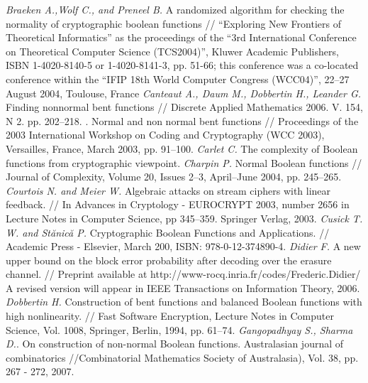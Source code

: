 \begin{thebibliography}{99}
 {\it Braeken A.,Wolf C., and Preneel B.} A randomized algorithm for checking the normality of cryptographic boolean functions // “Exploring New Frontiers of Theoretical Informatics” as the proceedings of the “3rd International Conference on Theoretical Computer Science (TCS2004)”, Kluwer Academic Publishers, ISBN 1-4020-8140-5 or 1-4020-8141-3, pp. 51-66; this conference was a co-located conference within the “IFIP 18th World Computer Congress (WCC04)”, 22–27 August 2004, Toulouse, France
 {\it Canteaut A., Daum M., Dobbertin H., Leander G.} Finding nonnormal bent functions // Discrete Applied Mathematics 2006. V. 154, N 2. pp. 202–218.
. Normal and non normal bent functions // Proceedings of the 2003 International Workshop on Coding and Cryptography (WCC 2003), Versailles, France, March 2003, pp. 91–100.
 {\it Carlet C.} The complexity of Boolean functions from cryptographic viewpoint.
 {\it Charpin P.} Normal Boolean functions // Journal of Complexity, Volume 20, Issues 2–3, April–June 2004, pp. 245–265.
 {\it Courtois N. and Meier W.} Algebraic attacks on stream ciphers with linear feedback. // In Advances in Cryptology - EUROCRYPT 2003, number 2656 in Lecture Notes in Computer Science, pp 345–359. Springer Verlag,  2003.
 {\it Cusick T. W. and Stănică P.} Cryptographic Boolean Functions and Applications. // Academic Press - Elsevier, March 200, ISBN: 978-0-12-374890-4.
 {\it Didier F.} A new upper bound on the block error probability after decoding over the erasure channel. // Preprint available at http://www-rocq.inria.fr/codes/Frederic.Didier/ A revised version will appear in IEEE Transactions on Information Theory, 2006.
 {\it Dobbertin H.} Construction of bent functions and balanced Boolean functions with high nonlinearity. // Fast Software Encryption, Lecture Notes in Computer Science, Vol. 1008, Springer, Berlin, 1994, pp. 61–74.
 {\it Gangopadhyay S., Sharma D.}. On construction of non-normal Boolean functions. Australasian journal of combinatorics //Combinatorial Mathematics Society of Australasia), Vol. 38, pp. 267 - 272, 2007.

\end{thebibliography}
